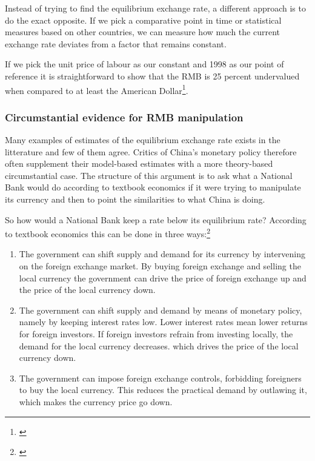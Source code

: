 % 
Instead of trying to find the equilibrium exchange rate, a different 
approach is to do the exact opposite. If we pick a comparative point in 
time or statistical measures based on other countries, we can measure 
how much the current exchange rate deviates from a factor that remains 
constant.

If we pick the unit price of labour as our constant and 1998 as our 
point of reference it is straightforward to show that the RMB is 25 
percent undervalued when compared to at least the American 
Dollar\footnote{\cite{chimerica2009}}. 


\subsubsection{Circumstantial evidence for RMB manipulation}

Many examples of estimates of the equilibrium exchange rate exists in 
the litterature and few of them agree. Critics of China's monetary 
policy therefore often supplement their model-based estimates with a 
more theory-based circumstantial case. The structure of this argument is 
to ask what a National Bank would do according to textbook economics if 
it were trying to manipulate its currency and then to point the 
similarities to what China is doing. 


So how would a National Bank keep a rate below its equilibrium rate? According to 
textbook economics this can be done in three ways:\footnote{\cite[pp. 
514]{Krugman2008}}

\begin{enumerate}
\item{The government can shift supply and demand for its currency by 
	intervening on the foreign exchange market. By buying foreign 
exchange and selling the local currency the government can drive the 
price of foreign exchange up and the price of the local currency down.}
\item{The government can shift supply and demand by means of monetary 
	policy, namely by keeping interest rates low. Lower interest rates 
mean lower returns for foreign investors. If foreign investors refrain 
from investing locally, the demand for the local currency decreases.  
which drives the price of the local currency down.}
\item{The government can impose foreign exchange controls, forbidding 
	foreigners to buy the local currency. This reduces the practical 
demand by outlawing it, which makes the currency price go down.}
\end{enumerate}

